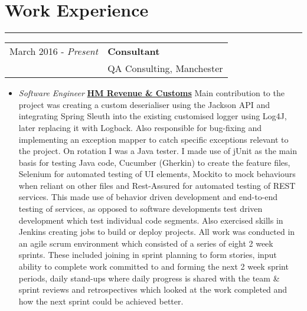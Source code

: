 \section*{\color{Maroon}Work Experience}
\hrule \smallskip
\noindent
\begin{flushright}
\begin{tabular}{r|l}
\indent March 2016 - \textit{Present} & \textbf{Consultant} \\
\indent & {\large{QA Consulting, Manchester}} \\
\end{tabular}
\end{flushright}
\begin{itemize}
\item
	\indent \textit{Software Engineer} \newline
	\indent \textbf{\underline{HM Revenue \& Customs}} \newline 
	 \newline \newline
    Main contribution to the project was creating a custom deserialiser using the Jackson API and integrating Spring Sleuth into the existing customised logger using Log4J, later replacing it with Logback. Also responsible for bug-fixing and implementing an exception mapper to catch specific exceptions relevant to the project.
    On rotation I was a Java tester. I made use of jUnit as the main basis for testing Java code, Cucumber (Gherkin) to create the feature files, Selenium for automated testing of UI elements, Mockito to mock behaviours when reliant on other files and 	Rest-Assured for automated testing of REST services. This made use of behavior driven development and end-to-end testing of services, as opposed to software developments test driven development which test individual code segments.
   	Also exercised skills in Jenkins creating jobs to build or deploy projects.\newline \newline
   	All work was conducted in an agile scrum environment which consisted of a series of eight 2 week sprints. These included joining in sprint planning to form stories, input ability to complete work committed to and forming the next 2 week sprint periods, daily stand-ups where daily progress is shared with the team \& sprint reviews and retrospectives which looked at the work completed and how the next sprint could be achieved better.\newline

\end{itemize}
